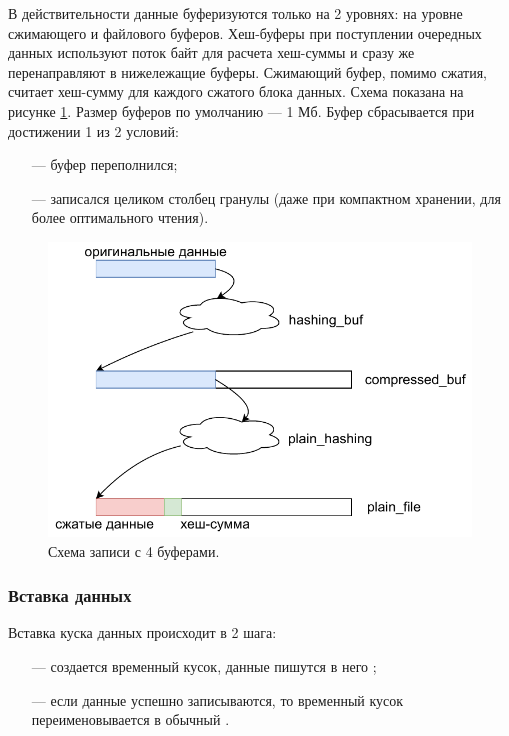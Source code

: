 В действительности данные буферизуются только на 2 уровнях: на уровне сжимающего и файлового буферов. Хеш-буферы при поступлении очередных данных используют поток байт для расчета хеш-суммы и сразу же перенаправляют в нижележащие буферы. Сжимающий буфер, помимо сжатия, считает хеш-сумму для каждого сжатого блока данных. Схема показана на рисунке \ref{fig:bufscheme}. Размер буферов по умолчанию --- 1 Мб. Буфер сбрасывается при достижении 1 из 2 условий:
\begin{itemize}
	\item [---] буфер переполнился;
	\item [---] записался целиком столбец гранулы (даже при компактном хранении, для более оптимального чтения).
\end{itemize}

\begin{figure}[hbtp]
	\centering
	\includegraphics[width=\textwidth]{img/bufscheme.pdf}
	\caption{Схема записи с 4 буферами.}
	\label{fig:bufscheme}
\end{figure}


\subsubsection{Вставка данных}

Вставка куска данных происходит в 2 шага:
\begin{itemize}
	\item [---] создается временный кусок, данные пишутся в него \cite{inserttemp};
	\item [---] если данные успешно записываются, то временный кусок переименовывается в обычный \cite{insertrename}.
\end{itemize}


